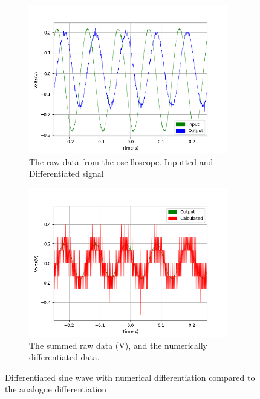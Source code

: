 \begin{figure}[h!]
\centering
\begin{subfigure}[t]{.475\textwidth}
  \centering
  \includegraphics[width=0.95\textwidth, height=0.22\textheight]{figures/Differentiation/scope_19raw.png}
  \caption{The raw data from the oscilloscope. Inputted and Differentiated signal}
 \label{fig:diff_19_og_data}
\end{subfigure}\hfill
\begin{subfigure}[t]{.475\textwidth}
  \centering
  \includegraphics[width=0.95\textwidth, height=0.22\textheight]{figures/Differentiation/scope_19_calc_front.png}
  \caption{The summed raw data (V), and the numerically differentiated data.}
\label{fig:diff_no_filter}
\end{subfigure}
\caption{Differentiated sine wave with numerical differentiation compared to the analogue differentiation}
\label{fig:diff_sine}
\end{figure}

